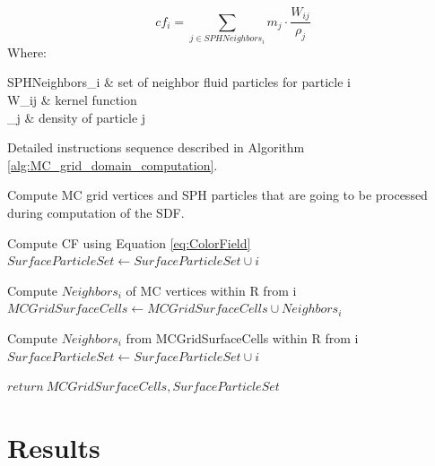 \begin{equation} \label{eq:ColorField}
	cf_i = \sum_{j\in SPHNeighbors_i}{m_j \cdot \dfrac{W_{ij}}{\rho_j}}
\end{equation}
Where:
\begin{conditions}
	SPHNeighbors_i & set of neighbor fluid particles for particle i\\
	W_{ij} & kernel function\\
	\rho_j & density of particle j\\
\end{conditions}
Detailed instructions sequence described in Algorithm \ref{alg:MC_grid_domain_computation}.
\begin{algorithm}
	\scriptsize
	\caption{Compute MC grid vertices and SPH particles that are going to be processed during computation of the SDF.}
	\label{alg:MC_grid_domain_computation}
	\begin{algorithmic}
			\State Compute CF using Equation \ref{eq:ColorField}
				\State $SurfaceParticleSet \gets SurfaceParticleSet \cup i$
			\EndIf
		\EndFor

			\State Compute $Neighbors_i$ of MC vertices within R from  i
			\State $MCGridSurfaceCells \gets MCGridSurfaceCells \cup Neighbors_i$
		\EndFor

			\State Compute $Neighbors_i$ from MCGridSurfaceCells within R from  i
				\State $SurfaceParticleSet \gets SurfaceParticleSet \cup i$
			\EndIf
		\EndFor

		\State $return\ MCGridSurfaceCells, SurfaceParticleSet$
	\end{algorithmic}
\end{algorithm}



\section{Results}

